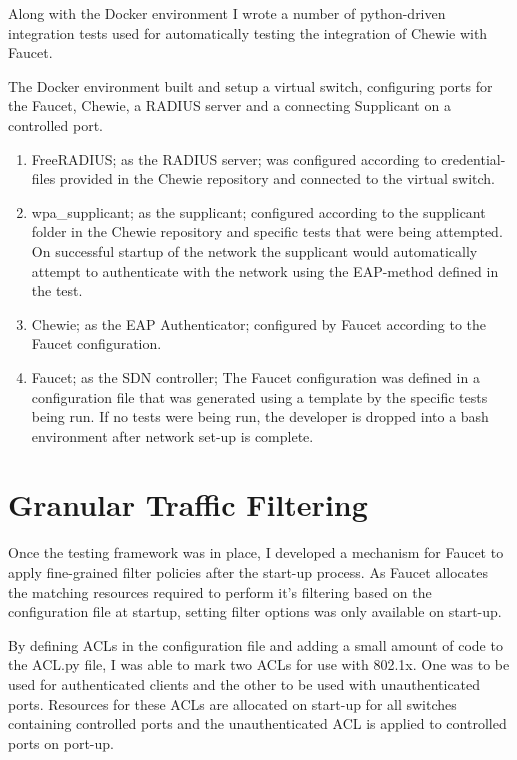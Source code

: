 Along with the Docker environment I wrote a number of python-driven integration tests used for automatically testing the integration of Chewie with Faucet.

The Docker environment built and setup a virtual switch, configuring ports for the Faucet, Chewie, a RADIUS server and a connecting Supplicant on a controlled port.
\begin{enumerate}
    \item FreeRADIUS\cite{freeradius_homepage}; as the RADIUS server; was configured according to credential-files provided in the Chewie repository and connected to the virtual switch. 
    \item wpa\_supplicant\cite{wpa_supplicant_man_page}; as the supplicant; configured according to the supplicant folder in the Chewie repository and specific tests that were being attempted. On successful startup of the network the supplicant would automatically attempt to authenticate with the network using the EAP-method defined in the test.
    \item Chewie; as the EAP Authenticator; configured by Faucet according to the Faucet configuration.
    \item Faucet; as the SDN controller; The Faucet configuration was defined in a configuration file that was generated using a template by the specific tests being run. If no tests were being run, the developer is dropped into a bash environment after network set-up is complete.
\end{enumerate}

\section{Granular Traffic Filtering}
Once the testing framework was in place, I developed a mechanism for Faucet to apply fine-grained filter policies after the start-up process. 
As Faucet allocates the matching resources required to perform it's filtering based on the configuration file at startup, setting filter options was only available on start-up.

By defining ACLs in the configuration file and adding a small amount of code to the ACL.py file, I was able to mark two ACLs for use with 802.1x. One was to be used for authenticated clients and the other to be used with unauthenticated ports. 
Resources for these ACLs are allocated on start-up for all switches containing controlled ports and the unauthenticated ACL is applied to controlled ports on port-up.

